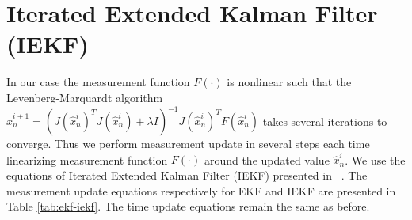 \clearpage
\section{Iterated Extended Kalman Filter (IEKF)}
In our case the measurement function $F(\cdot)$ is nonlinear such that the Levenberg-Marquardt algorithm
$\hat{x}_n^{i + 1} = (J(\hat{x}_n^i) ^T J(\hat{x}_n^i) + \lambda I)^{-1} J(\hat{x}_n^i)^T F(\hat{x}_n^i)$ takes several iterations to converge. Thus we perform measurement update in several steps each time linearizing measurement function  $F(\cdot)$ around the updated value $\hat{x}_n^i$. We use the equations of Iterated Extended Kalman Filter (IEKF) presented in ~\cite{havlik2015performance}. The measurement update equations respectively for EKF and IEKF are presented in Table \ref{tab:ekf-iekf}. The time update equations remain the same as before.

\begin{table}[!h] 
\centering
\caption{EKF vs IEKF measurement update \label{tab:ekf-iekf}}
\end{table}

